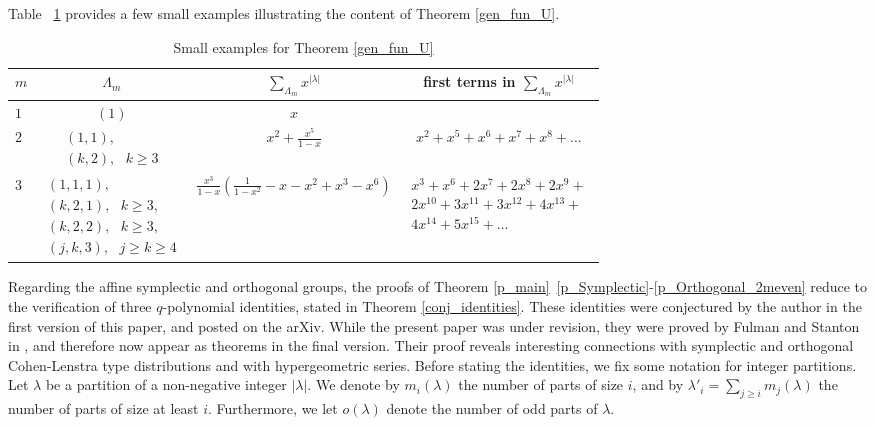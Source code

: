 \documentclass[a4paper, 12pt, oneside]{amsart}
\theoremstyle{definition}
\begin{document}
Table ~\ref{exgenfun} provides a few small examples illustrating the content of Theorem \ref{gen_fun_U}.
\begin{table}[h]\centering
\caption{Small examples for Theorem \ref{gen_fun_U} }
\label{exgenfun}
\begin{tabular}{lccc} \toprule
      $m$             & $\Lambda_m$    & $\sum_{\Lambda_m}x^{|\lambda|}$ & first terms in   $\sum_{\Lambda_m}x^{|\lambda|}$  \\ \midrule
$1$ & $(1)$  & $x$   \\[1em]  
$2$  & $\begin{array}{c}(1,1), \\ (k,2) ,\text{ } k\ge 3 \end{array}$  & $x^2+\frac{x^5}{1-x}$ & $x^2+x^5+x^6+x^7+x^8+\dots
$  \\[1.5em]  
$3$  &$\begin{array}{c} (1,1,1),\\ 
(k,2,1),\text{ }k\ge3, \\
(k,2,2),\text{ }k\ge3, \\(j,k,3),\text{ }j\ge k\ge4
\end{array}$  &$\frac{x^3}{1-x}\left(\frac{1}{1-x^2}-x-x^2+x^3-x^6\right)$ & $\begin{array}{l} x^3+x^6+2x^7+2x^8+2x^9+\\2x^{10}+
3x^{11}+3x^{12}+4x^{13}+\\4x^{14}+5x^{15}+\dots
\end{array}$ \\\bottomrule
\end{tabular}
\end{table}

Regarding the affine symplectic and orthogonal groups, the proofs of Theorem \ref{p_main}~\eqref{p_Symplectic}-\eqref{p_Orthogonal_2meven} reduce to the verification of three $q$-polynomial identities, stated in Theorem \ref{conj_identities}. These identities were conjectured by the author in the first version of this paper, and posted on the arXiv.
While the present paper was under revision, they were proved by Fulman and Stanton in \cite{FulmanStanton25}, and therefore now appear as theorems in the final version.
Their proof reveals interesting connections with symplectic and orthogonal Cohen-Lenstra type distributions and with hypergeometric series. Before stating the identities, we fix some notation for integer partitions. Let $\lambda$ be a partition of a non-negative integer $|\lambda|$. We denote by $m_i(\lambda)$ the number of parts of size $i$, and by $\lambda'_i=\sum_{j\ge i}m_j(\lambda)$ the number of parts of size at least $i$. Furthermore, we let $o(\lambda)$ denote the number of odd parts of $\lambda$. 
\end{document}
